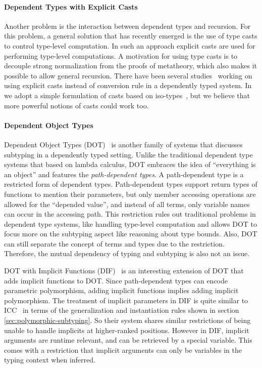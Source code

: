 \paragraph{Dependent Types with Explicit Casts} Another problem is the
interaction between dependent types and recursion. For this
problem, a general solution that has recently emerged is the use
of type casts to control type-level computation. In such an approach explicit casts
are used for performing type-level computations. A motivation for
using type casts is to decouple strong normalization from the
proofs of metatheory, which also makes it possible to allow general
recursion. There have been several studies~\citep{guru,sjoberg:msfp12,
  kimmel:plpv, zombie:popl15, fc:kind, Doorn:2013hq,isotype} working
on using explicit casts instead of conversion rule in a dependently
typed system. In \name we adopt a simple formulation of casts based
on iso-types~\citep{isotype}, but we believe that more powerful notions
of casts could work too.

\paragraph{Dependent Object Types}

Dependent Object Types (DOT)~\citep{dot:dot,dot:path,dot:sound} is another
family of systems that discusses subtyping in a dependently typed setting.
Unlike the traditional dependent type systems that based on lambda calculus, DOT
embraces the idea of ``everything is an object'' and features the \emph{path-dependent types}.
A path-dependent type is a restricted form of dependent types.
Path-dependent types
support return types of functions
to mention their parameters, but only
member accessing operations are allowed for the ``depended value'',
and instead of all terms, only variable names can occur in the accessing path.
This restriction rules out traditional problems in dependent type systems,
like handling type-level computation and allows DOT to focus more on the subtyping
aspect like reasoning about type bounds. Also, DOT can still separate the
concept of terms and types due to the restriction. Therefore, the mutual dependency of
typing and subtyping is also not an issue.

DOT with Implicit Functions (DIF)~\citep{dif} is an interesting extension of DOT
that adds implicit functions to DOT.
Since path-dependent types can encode parametric
polymorphism, adding implicit functions implies adding implicit polymorphism.
The treatment of implicit parameters in DIF is quite similar
to ICC~\citep{miquel2001implicit} in terms of the generalization and
instantiation rules shown in section \ref{sec:polymorphic-subtyping}.
So their system shares similar restrictions of being unable to handle implicits
at higher-ranked positions. However in DIF, implicit arguments are runtime relevant,
and can be retrieved by a special variable. This comes with a restriction that
implicit arguments can only be variables in the typing context when inferred.

